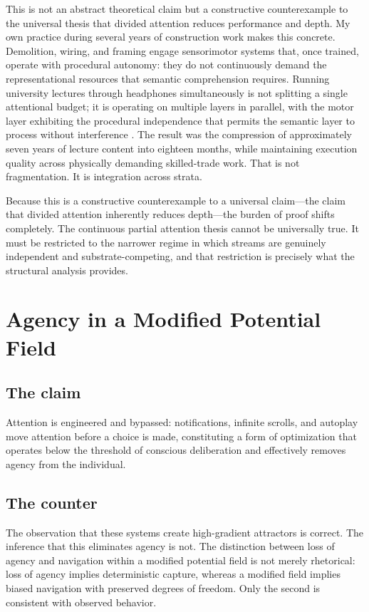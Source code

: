 \documentclass[12pt, a4paper]{article}
\begin{document}
This is not an abstract theoretical claim but a constructive counterexample to the universal thesis that divided attention reduces performance and depth. My own practice during several years of construction work makes this concrete. Demolition, wiring, and framing engage sensorimotor systems that, once trained, operate with procedural autonomy: they do not continuously demand the representational resources that semantic comprehension requires. Running university lectures through headphones simultaneously is not splitting a single attentional budget; it is operating on multiple layers in parallel, with the motor layer exhibiting the procedural independence that permits the semantic layer to process without interference \cite{Hutchins1995,Suchman2007}. The result was the compression of approximately seven years of lecture content into eighteen months, while maintaining execution quality across physically demanding skilled-trade work. That is not fragmentation. It is integration across strata.

Because this is a constructive counterexample to a universal claim---the claim that divided attention inherently reduces depth---the burden of proof shifts completely. The continuous partial attention thesis cannot be universally true. It must be restricted to the narrower regime in which streams are genuinely independent and substrate-competing, and that restriction is precisely what the structural analysis provides.

\section{Agency in a Modified Potential Field}

\subsection{The claim}
Attention is engineered and bypassed: notifications, infinite scrolls, and autoplay move attention before a choice is made, constituting a form of optimization that operates below the threshold of conscious deliberation and effectively removes agency from the individual.

\subsection{The counter}
The observation that these systems create high-gradient attractors is correct. The inference that this eliminates agency is not. The distinction between loss of agency and navigation within a modified potential field is not merely rhetorical: loss of agency implies deterministic capture, whereas a modified field implies biased navigation with preserved degrees of freedom. Only the second is consistent with observed behavior.
\end{document}
